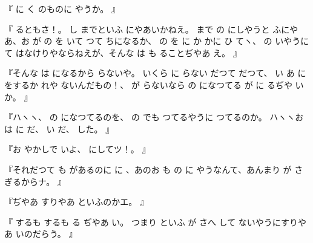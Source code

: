
『
に
く
のものに
やうか。
』

『
るともさ！。
し
までといふ
にやあいかねえ。
まで
の
にしやうと
ふにやあ、お
が
の
を
いて
つて
ちになるか、
の
を
に
か
かに
ひ
てヽ、
の
いやうに
て
はなけりやならねえが、そんな
は
も
ることぢやあ
え。
』

『そんな
は
になるから
らないや。
いくら
に
らない
だつて
だつて、
い
あ
に
をするか
れや
ないんだもの！、
が
らないなら
の
になつてる
が
に
るぢや
いか。
』

『ハヽヽ、
の
になつてるのを、
の
でも
つてるやうに
つてるのか。
ハヽヽお
は
に
だ、
い
だ、
した。
』

『お
やかしで
いよ、
にしてツ！。
』

『それだつて
も
があるのに
に
、あのお
も
の
に
やうなんて、あんまり
が
さ
ぎるからナ。
』

『ぢやあ
すりやあ
といふのかエ。
』

『
するも
するも
る
ぢやあ
い。
つまり
といふ
が
さへ
して
ないやうにすりやあ
いのだらう。
』

